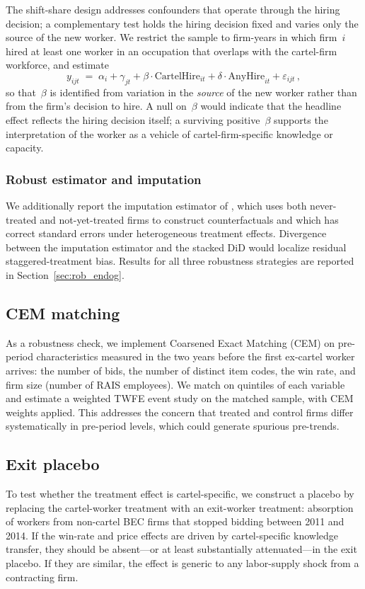 The shift-share design addresses confounders that operate through the
hiring decision; a complementary test holds the hiring decision fixed and
varies only the source of the new worker. We restrict the sample to
firm-years in which firm~$i$ hired at least one worker in an occupation
that overlaps with the cartel-firm workforce, and estimate
\begin{equation}\label{eq:condhire}
y_{ijt} \;=\; \alpha_i + \gamma_{jt}
            + \beta \cdot \text{CartelHire}_{it}
            + \delta \cdot \text{AnyHire}_{it}
            + \varepsilon_{ijt}\,,
\end{equation}
so that~$\beta$ is identified from variation in the \emph{source} of the
new worker rather than from the firm's decision to hire. A null on~$\beta$
would indicate that the headline effect reflects the hiring decision
itself; a surviving positive~$\beta$ supports the interpretation of the
worker as a vehicle of cartel-firm-specific knowledge or capacity.

\subsubsection*{Robust estimator and imputation}

We additionally report the imputation estimator of
\citet{borusyak2024revisiting}, which uses both never-treated and
not-yet-treated firms to construct counterfactuals and which has correct
standard errors under heterogeneous treatment effects. Divergence between
the imputation estimator and the stacked DiD would localize residual
staggered-treatment bias. Results for all three robustness strategies are
reported in Section~\ref{sec:rob_endog}.

\subsection{CEM matching}

As a robustness check, we implement Coarsened Exact Matching (CEM) on pre-period characteristics measured in the two years before the first ex-cartel worker arrives: the number of bids, the number of distinct item codes, the win rate, and firm size (number of RAIS employees). We match on quintiles of each variable and estimate a weighted TWFE event study on the matched sample, with CEM weights applied. This addresses the concern that treated and control firms differ systematically in pre-period levels, which could generate spurious pre-trends.

\subsection{Exit placebo}

To test whether the treatment effect is cartel-specific, we construct a placebo by replacing the cartel-worker treatment with an exit-worker treatment: absorption of workers from non-cartel BEC firms that stopped bidding between 2011 and 2014. If the win-rate and price effects are driven by cartel-specific knowledge transfer, they should be absent---or at least substantially attenuated---in the exit placebo. If they are similar, the effect is generic to any labor-supply shock from a contracting firm.
